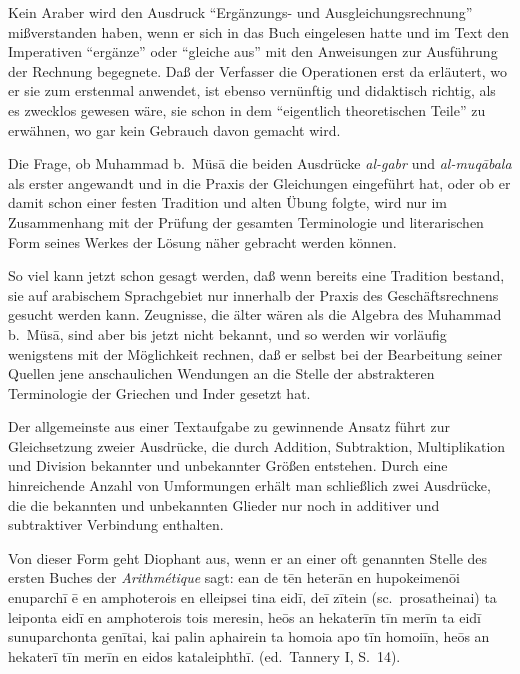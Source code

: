 \documentclass[11pt,a4paper]{article}
\newcommand{\begingreek}{\bgroup\greekfont}
\newcommand{\closegreek}{\egroup}
\newcommand{\enquote}[1]{``#1''}
\begin{document}
Kein Araber wird den Ausdruck \enquote{Erg\"anzungs- und Ausgleichungsrechnung} mi\ss{}verstanden haben, wenn er sich in das Buch eingelesen hatte und im Text den Imperativen \enquote{erg\"anze} oder \enquote{gleiche aus} mit den Anweisungen zur Ausf\"uhrung der Rechnung begegnete. Da\ss{} der Verfasser die Operationen erst da erl\"autert, wo er sie zum erstenmal anwendet, ist ebenso vern\"unftig und didaktisch richtig, als es zwecklos gewesen w\"are, sie schon in dem \enquote{eigentlich theoretischen Teile} zu erw\"ahnen, wo gar kein Gebrauch davon gemacht wird.

Die Frage, ob Muhammad b.\ M\"us\=a die beiden Ausdr\"ucke \textit{al-gabr} und \textit{al-muq\=abala} als erster angewandt und in die Praxis der Gleichungen eingef\"uhrt hat, oder ob er damit schon einer festen Tradition und alten \"Ubung folgte, wird nur im Zusammenhang mit der Pr\"ufung der gesamten Terminologie und literarischen Form seines Werkes der L\"osung n\"aher gebracht werden k\"onnen.

So viel kann jetzt schon gesagt werden, da\ss{} wenn bereits eine Tradition bestand, sie auf arabischem Sprachgebiet nur innerhalb der Praxis des Gesch\"aftsrechnens gesucht werden kann. Zeugnisse, die \"alter w\"aren als die Algebra des Muhammad b.\ M\"us\=a, sind aber bis jetzt nicht bekannt, und so werden wir vorl\"aufig wenigstens mit der M\"oglichkeit rechnen, da\ss{} er selbst bei der Bearbeitung seiner Quellen jene anschaulichen Wendungen an die Stelle der abstrakteren Terminologie der Griechen und Inder gesetzt hat.

Der allgemeinste aus einer Textaufgabe zu gewinnende Ansatz f\"uhrt zur Gleichsetzung zweier Ausdr\"ucke, die durch Addition, Subtraktion, Multiplikation und Division bekannter und unbekannter Gr\"o\ss{}en entstehen. Durch eine hinreichende Anzahl von Umformungen erh\"alt man schlie\ss{}lich zwei Ausdr\"ucke, die die bekannten und unbekannten Glieder nur noch in additiver und subtraktiver Verbindung enthalten.

Von dieser Form geht Diophant aus, wenn er an einer oft genannten Stelle des ersten Buches der \textit{Arithm\'etique} sagt: \begingreek ean de t\=en heter\=an en hupokeimen\=oi enuparch\=i \=e en amphoterois en elleipsei tina eid\=i, de\=i z\=itein (sc.\ prosatheinai) ta leiponta eid\=i en amphoterois tois meresin, he\=os an hekater\=in t\=in mer\=in ta eid\=i sunuparchonta gen\=itai, kai palin aphairein ta homoia apo t\=in homoi\=in, he\=os an hekater\=i t\=in mer\=in en eidos kataleiphth\=i. \closegreek (ed.\ Tannery I, S.\ 14).
\end{document}
